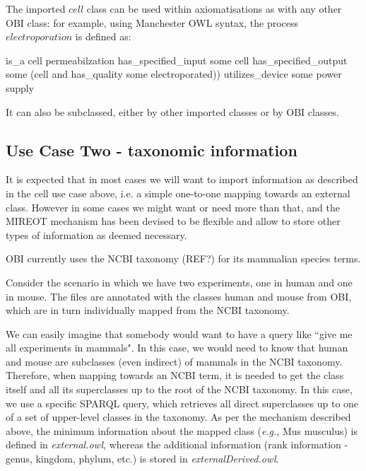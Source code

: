 \documentclass[a4paper,10pt,twocolumn]{article}
\begin{document}
The imported $cell$ class can be used within axiomatisations as with any other OBI class: for example, using Manchester OWL syntax, the process $electroporation$ is defined as:


\begin{footnotesize}
\begin{verbatimtab}
   is_a cell permeabilzation
   has_specified_input some cell
   has_specified_output some 
     (cell and has_quality some electroporated))
   utilizes_device some power supply
\end{verbatimtab}%
\end{footnotesize}

It can also be subclassed, either by other imported classes or by OBI classes.

\subsection*{Use Case Two - taxonomic information}

It is expected that in most cases we will want to import information as described in the cell use case above, i.e. a simple one-to-one mapping towards an external class. However in some cases we might want or need more than that, and the MIREOT mechanism has been devised to be flexible and allow to store other types of information as deemed necessary.

OBI currently uses the NCBI taxonomy (REF?) for its mammalian species terms. 

Consider the scenario in which we have two experiments, one in human and one in mouse. The files are annotated with the classes human and mouse from OBI, which are in turn individually mapped from the NCBI taxonomy.

We can easily imagine that somebody would want to have a query like ``give me all experiments in mammals". In this case, we would need to know that human and mouse are subclasses (even indirect) of mammals in the NCBI taxonomy.
Therefore, when mapping towards an NCBI term, it is needed to get the class itself and all its superclasses up to the root of the NCBI taxonomy.
In this case, we use a specific SPARQL query, which retrieves all direct superclasses up to one of a set of upper-level classes in the taxonomy.%
As per the mechanism described above, the minimum information about the mapped class (\emph{e.g.}, Mus musculus) is defined in \emph{external.owl}, whereas the additional information (rank information - genus, kingdom, phylum, etc.) is stored in \emph{ externalDerived.owl}. 
\end{document}
